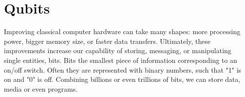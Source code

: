 
\section{Qubits}
Improving classical computer hardware can take many shapes: more processing power, bigger memory size, or faster data transfers. Ultimately, these improvements increase our capability of storing, messaging, or manipulating single entities, bits. Bits the smallest piece of information corresponding to an on/off switch. Often they are represented with binary numbers, such that "1" is on and "0" is off. Combining billions or even trillions of bits, we can store data, media or even programs.


